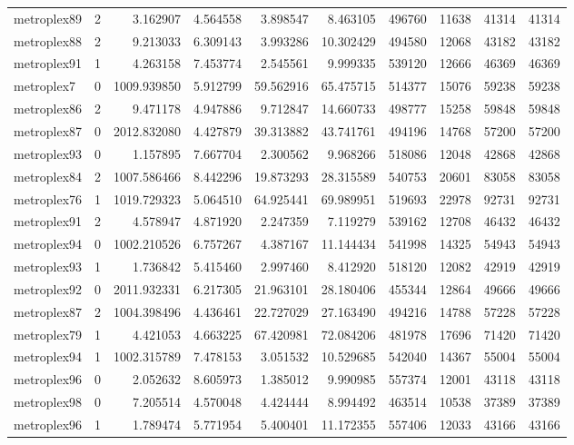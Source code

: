 \begin{longtable}{|l|r|r|r|r|r|r|r|r|r|}
metroplex89 & 2 & 3.162907 & 4.564558 & 3.898547 & 8.463105 & 496760 & 11638 & 41314 & 41314 \\
metroplex88 & 2 & 9.213033 & 6.309143 & 3.993286 & 10.302429 & 494580 & 12068 & 43182 & 43182 \\
metroplex91 & 1 & 4.263158 & 7.453774 & 2.545561 & 9.999335 & 539120 & 12666 & 46369 & 46369 \\
metroplex7 & 0 & 1009.939850 & 5.912799 & 59.562916 & 65.475715 & 514377 & 15076 & 59238 & 59238 \\
metroplex86 & 2 & 9.471178 & 4.947886 & 9.712847 & 14.660733 & 498777 & 15258 & 59848 & 59848 \\
metroplex87 & 0 & 2012.832080 & 4.427879 & 39.313882 & 43.741761 & 494196 & 14768 & 57200 & 57200 \\
metroplex93 & 0 & 1.157895 & 7.667704 & 2.300562 & 9.968266 & 518086 & 12048 & 42868 & 42868 \\
metroplex84 & 2 & 1007.586466 & 8.442296 & 19.873293 & 28.315589 & 540753 & 20601 & 83058 & 83058 \\
metroplex76 & 1 & 1019.729323 & 5.064510 & 64.925441 & 69.989951 & 519693 & 22978 & 92731 & 92731 \\
metroplex91 & 2 & 4.578947 & 4.871920 & 2.247359 & 7.119279 & 539162 & 12708 & 46432 & 46432 \\
metroplex94 & 0 & 1002.210526 & 6.757267 & 4.387167 & 11.144434 & 541998 & 14325 & 54943 & 54943 \\
metroplex93 & 1 & 1.736842 & 5.415460 & 2.997460 & 8.412920 & 518120 & 12082 & 42919 & 42919 \\
metroplex92 & 0 & 2011.932331 & 6.217305 & 21.963101 & 28.180406 & 455344 & 12864 & 49666 & 49666 \\
metroplex87 & 2 & 1004.398496 & 4.436461 & 22.727029 & 27.163490 & 494216 & 14788 & 57228 & 57228 \\
metroplex79 & 1 & 4.421053 & 4.663225 & 67.420981 & 72.084206 & 481978 & 17696 & 71420 & 71420 \\
metroplex94 & 1 & 1002.315789 & 7.478153 & 3.051532 & 10.529685 & 542040 & 14367 & 55004 & 55004 \\
metroplex96 & 0 & 2.052632 & 8.605973 & 1.385012 & 9.990985 & 557374 & 12001 & 43118 & 43118 \\
metroplex98 & 0 & 7.205514 & 4.570048 & 4.424444 & 8.994492 & 463514 & 10538 & 37389 & 37389 \\
metroplex96 & 1 & 1.789474 & 5.771954 & 5.400401 & 11.172355 & 557406 & 12033 & 43166 & 43166 \\

\end{longtable}
